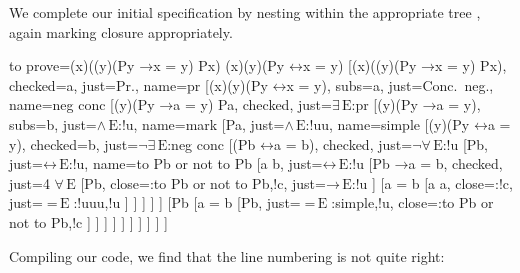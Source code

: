 \documentclass[10pt,british,a4paper]{ltxdoc}
\newcommand*{\lif}{\ensuremath{\mathbin{\rightarrow}}}
\newcommand*{\liff}{\ensuremath{\mathbin{\leftrightarrow}}}
\newcommand*{\elim}{\,\text{E}}
\begin{document}
We complete our initial specification by nesting \nyth*{} within the appropriate tree \nyth[12], again marking closure appropriately.
\begin{latexcode}
\begin{prooftree}
  {
    to prove={(\exists x)((\forall y)(Py \lif x = y) \land Px) \sststile{}{} (\exists x)(\forall y)(Py \liff x = y)}
  }
  [{(\exists x)((\forall y)(Py \lif x = y) \land Px)}, checked=a, just=Pr., name=pr
    [{\lnot (\exists x)(\forall y)(Py \liff x = y)}, subs=a, just=Conc.~neg., name=neg conc
      [{(\forall y)(Py \lif a = y) \land Pa}, checked, just=$\exists\elim$:pr
        [{(\forall y)(Py \lif a = y)}, subs=b, just=$\land\elim$:!u, name=mark
          [Pa, just=$\land\elim$:!uu, name=simple
            [{\lnot (\forall y)(Py \liff a = y)}, checked=b, just=$\lnot\exists\elim$:neg conc
              [{\lnot (Pb \liff a = b)}, checked, just=$\lnot\forall\elim$:!u
                [Pb, just=$\liff\elim$:!u, name=to Pb or not to Pb
                 [a \neq b, just=$\liff\elim$:!u
                  [{Pb \lif a = b}, checked, just=4 $\forall\elim$
                      [\lnot Pb, close={:to Pb or not to Pb,!c}, just=$\lif\elim$:!u
                      ]
                      [{a = b}
                        [a \neq a, close={:!c}, just={$=\elim$:{!uuu,!u}}
                        ]
                      ]
                  ]
                ]
                ]
                [\lnot Pb
                 [{a = b}
                    [Pb, just={$=\elim$:{simple,!u}}, close={:to Pb or not to Pb,!c}
                    ]
                 ]
                ]
              ]
            ]
          ]
        ]
      ]
    ]
  ]
\end{prooftree}
\end{latexcode}

Compiling our code, we find that the line numbering is not quite right:
\end{document}
